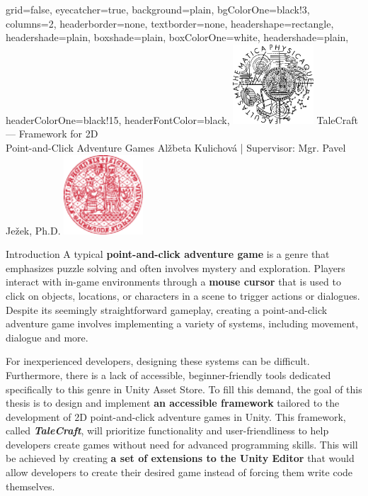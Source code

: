 \documentclass[portrait,a0paper,fontscale=0.35]{baposter}
\begin{document}
\color{black!80} %
\begin{poster}{grid=false,
	eyecatcher=true,
	background=plain,
	bgColorOne=black!3, %
	columns=2,
	headerborder=none,
	textborder=none,
	headershape=rectangle,
	headershade=plain,
	boxshade=plain,
	boxColorOne=white,
	headershade=plain,
	headerColorOne=black!15, %
	headerFontColor=black,
	}%
	{\includegraphics[height=8em]{logos/mff-black.pdf}}
	{\Huge TaleCraft — Framework for 2D\\ Point-and-Click Adventure Games}
	{\vspace{1ex} Alžbeta Kulichová | Supervisor: Mgr. Pavel Ježek, Ph.D.}
	{\includegraphics[height=8em]{logos/uk-red.pdf}}

%
%

\begin{posterbox}[column=0, span=1, name=background]{Introduction}
A typical \textbf{point-and-click adventure game} is a genre that emphasizes puzzle solving and often involves mystery and exploration. Players interact with in-game environments through a \textbf{mouse cursor} that is used to click on objects, locations, or characters in a scene to trigger actions or dialogues. Despite its seemingly straightforward gameplay, creating a point-and-click adventure game involves implementing a variety of systems, including movement, dialogue and more. 

For inexperienced developers, designing these systems can be difficult. Furthermore, there is a lack of accessible, beginner-friendly tools dedicated specifically to this genre in Unity Asset Store. To fill this demand, the goal of this thesis is to design and implement \textbf{an accessible framework} tailored to the development of 2D point-and-click adventure games in Unity. This framework, called \textit{\textbf{TaleCraft}}, will prioritize functionality and user-friendliness to help developers create games without need for advanced programming skills. This will be achieved by creating \textbf{a set of extensions to the Unity Editor} that would allow developers to create their desired game instead of forcing them write code themselves.
\end{posterbox}


\end{poster}
\end{document}
